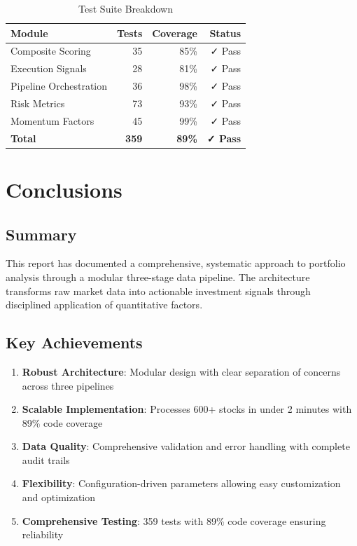 \documentclass[11pt, a4paper, twoside]{article}
\begin{document}
\begin{table}[H]
    \centering
    \caption{Test Suite Breakdown}
    \label{tab:test-coverage}
    \begin{tabular}{|l|r|r|r|}
        \hline
        \textbf{Module} & \textbf{Tests} & \textbf{Coverage} & \textbf{Status} \\
        \hline
        Composite Scoring & 35 & 85\% & ✓ Pass \\
        \hline
        Execution Signals & 28 & 81\% & ✓ Pass \\
        \hline
        Pipeline Orchestration & 36 & 98\% & ✓ Pass \\
        \hline
        Risk Metrics & 73 & 93\% & ✓ Pass \\
        \hline
        Momentum Factors & 45 & 99\% & ✓ Pass \\
        \hline
        \textbf{Total} & \textbf{359} & \textbf{89\%} & \textbf{✓ Pass} \\
        \hline
    \end{tabular}
\end{table}


\section{Conclusions}
\label{sec:conclusions}

\subsection{Summary}

This report has documented a comprehensive, systematic approach to portfolio analysis through a modular three-stage data pipeline. The architecture transforms raw market data into actionable investment signals through disciplined application of quantitative factors.

\subsection{Key Achievements}

\begin{enumerate}
    \item \textbf{Robust Architecture}: Modular design with clear separation of concerns across three pipelines
    \item \textbf{Scalable Implementation}: Processes 600+ stocks in under 2 minutes with 89\% code coverage
    \item \textbf{Data Quality}: Comprehensive validation and error handling with complete audit trails
    \item \textbf{Flexibility}: Configuration-driven parameters allowing easy customization and optimization
    \item \textbf{Comprehensive Testing}: 359 tests with 89\% code coverage ensuring reliability
\end{enumerate}
\end{document}
